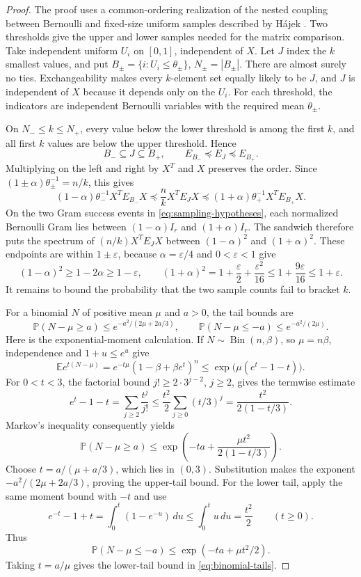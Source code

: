 \documentclass[11pt]{article}
\theoremstyle{definition}
\theoremstyle{remark}
\theoremstyle{plain}
\newcommand{\E}{\mathbb E}
\newcommand{\Prob}{\mathbb P}
\begin{document}
\begin{proof}
The proof uses a common-ordering realization of the nested coupling between
Bernoulli and fixed-size uniform samples described by H\'ajek
\cite[Section~2, pp.~362--363]{hajek_sampling}.
Two thresholds give the upper and lower samples needed for the
matrix comparison.
Take independent uniform \(U_i\) on \([0,1]\), independent of \(X\).
Let \(J\) index the \(k\) smallest values, and put
\(B_\pm=\{i:U_i\le\theta_\pm\}\), \(N_\pm=|B_\pm|\).
There are almost surely no ties. Exchangeability makes every
$k$-element set equally likely to be $J$, and $J$ is independent
of $X$ because it depends only on the $U_i$. For each threshold,
the indicators are independent Bernoulli variables with the required
mean $\theta_\pm$.

On $N_-\le k\le N_+$, every value below the lower threshold is
among the first $k$, and all first $k$ values are below the upper
threshold. Hence
\[
 B_-\subseteq J\subseteq B_+,
 \qquad E_{B_-}\preceq E_J\preceq E_{B_+}.
\]
Multiplying on the left and right by $X^T$ and $X$ preserves the
order. Since $(1\pm\alpha)\theta_\pm^{-1}=n/k$, this gives
\[
 (1-\alpha)\theta_-^{-1}X^TE_{B_-}X
 \preceq \frac nkX^TE_JX
 \preceq (1+\alpha)\theta_+^{-1}X^TE_{B_+}X.
\]
On the two Gram success events in \eqref{eq:sampling-hypotheses},
each normalized Bernoulli Gram lies between
$(1-\alpha)I_r$ and $(1+\alpha)I_r$. The sandwich therefore puts
the spectrum of $(n/k)X^TE_JX$ between
\((1-\alpha)^2\) and \((1+\alpha)^2\). These endpoints are within
$1\pm\varepsilon$, because $\alpha=\varepsilon/4$ and
$0<\varepsilon<1$ give
\[
 (1-\alpha)^2\ge1-2\alpha\ge1-\varepsilon,
 \qquad
 (1+\alpha)^2=1+\frac\varepsilon2+\frac{\varepsilon^2}{16}
                   \le1+\frac{9\varepsilon}{16}\le1+\varepsilon.
\]
It remains to bound the probability that the two sample counts
fail to bracket $k$.

For a binomial \(N\) of positive mean \(\mu\) and $a>0$, the tail bounds are
\begin{equation}\label{eq:binomial-tails}
 \Prob(N-\mu\ge a)\le e^{-a^2/(2\mu+2a/3)},\qquad
 \Prob(N-\mu\le-a)\le e^{-a^2/(2\mu)}.
\end{equation}
Here is the exponential-moment calculation. If
$N\sim\operatorname{Bin}(n,\beta)$, so $\mu=n\beta$, independence
and $1+u\le e^u$ give
\[
 \E e^{t(N-\mu)}
   =e^{-t\mu}(1-\beta+\beta e^t)^n
   \le\exp\bigl(\mu(e^t-1-t)\bigr).
\]
For $0<t<3$, the factorial bound $j!\ge2\cdot3^{j-2}$,
$j\ge2$, gives the termwise estimate
\[
 e^t-1-t=\sum_{j\ge2}\frac{t^j}{j!}
       \le\frac{t^2}{2}\sum_{j\ge0}(t/3)^j
       =\frac{t^2}{2(1-t/3)}.
\]
Markov's inequality consequently yields
\[
 \Prob(N-\mu\ge a)
   \le\exp\left(-ta+\frac{\mu t^2}{2(1-t/3)}\right).
\]
Choose $t=a/(\mu+a/3)$, which lies in $(0,3)$. Substitution makes
the exponent $-a^2/(2\mu+2a/3)$, proving the upper-tail bound.
For the lower tail, apply the same moment bound with $-t$ and use
\[
 e^{-t}-1+t=\int_0^t(1-e^{-u})\,du
          \le\int_0^t u\,du=\frac{t^2}{2}\qquad(t\ge0).
\]
Thus
\[
 \Prob(N-\mu\le-a)\le\exp(-ta+\mu t^2/2).
\]
Taking $t=a/\mu$ gives the lower-tail bound in
\eqref{eq:binomial-tails}.


\end{proof}
\end{document}

